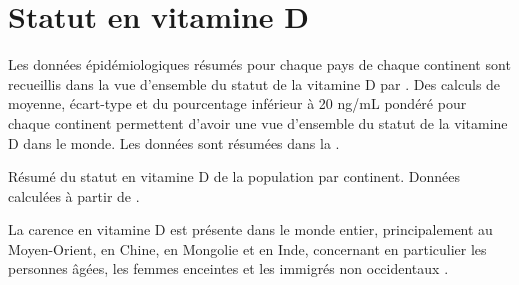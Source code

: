 \documentclass[
  a4paper,
  DIV=11,
  numbers=noendperiod,
  listof=totoc]{scrreprt}
\begin{document}
\section{Statut en vitamine D}\label{sec-statut-vd}

Les données épidémiologiques résumés pour chaque pays de chaque
continent sont recueillis dans la vue d'ensemble du statut de la
vitamine D par \textcite{Schoor.2017}. Des calculs de moyenne,
écart-type et du pourcentage inférieur à 20 ng/mL pondéré pour chaque
continent permettent d'avoir une vue d'ensemble du statut de la vitamine
D dans le monde. Les données sont résumées dans la .

\begin{table}

\caption{\label{tbl-statut-vd}Résumé du statut en vitamine D de la
population par continent. Données calculées à partir de
\textcite{Schoor.2017}.}


\end{table}%

La carence en vitamine D est présente dans le monde entier,
principalement au Moyen-Orient, en Chine, en Mongolie et en Inde,
concernant en particulier les personnes âgées, les femmes enceintes et
les immigrés non occidentaux \autocite{Schoor.2017}.
\end{document}
